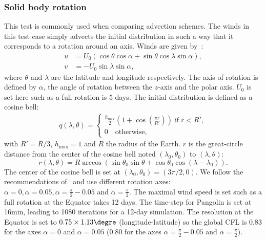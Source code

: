 \subsubsection{Solid body rotation}
This test is commonly used when comparing advection schemes. The winds
in this test case simply advects the initial distribution in such a way that it
corresponds to a rotation around an axis. Winds are given
by~\cite{Williamson1992}:
\begin{align*}
  u &= U_0 (\cos \theta \cos \alpha + \sin \theta \cos \lambda \sin \alpha),\\
  v &= -U_0 \sin \lambda \sin \alpha,
\end{align*}
where $\theta$ and $\lambda$ are the latitude and longitude respectively.
The axis of rotation is defined by $\alpha$, the angle of rotation between the
$z$-axis and the polar axis.  $U_0$ is set here such as a full rotation is 5
days. The initial distribution is defined as a cosine bell:
\begin{align*}
  q(\lambda, \theta) =
  \begin{cases}
    \displaystyle%
   \frac{h_{\text{max}}}{2}%
    \left(1+\cos\left( \frac{\pi r}{R'}\right) \right) \; \text{if} \; r < R',\\
    0 \quad \text{otherwise},
  \end{cases}
\end{align*}
with $R'=R/3$, $h_{\text{max}}=1$ and $R$ the radius of the Earth. $r$ is the great-circle distance
 from the center of the cosine bell noted $(\lambda_0, \theta_0)$ to $(\lambda,\theta)$:
\begin{equation*}
  r(\lambda, \theta)=R \arccos(\sin\theta_0\sin\theta +
  \cos\theta_0\cos(\lambda-\lambda_0)).
\end{equation*}
The center of the cosine bell is set at $(\lambda_0, \theta_0)=(3\pi/2, 0)$.  We
follow the recommendations of~\cite{Williamson1992} and use different rotation
axes: $\alpha=0, \alpha=0.05, \alpha=\frac{\pi}{2}-0.05$ and
$\alpha=\frac{\pi}{2}$. The maximal wind speed is set such as a full rotation at
the Equator takes 12 days. The time-step for Pangolin is set at 16min, leading
to 1080 iterations for a 12-day simulation. The resolution at the Equator is
set to $0.75\times1.13\degre$ (longitude-latitude) so the global CFL is $0.83$
for the axes $\alpha=0$ and $\alpha=0.05$ ($0.80$ for the axes
$\alpha=\frac{\pi}{2}-0.05$ and $\alpha=\frac{\pi}{2}$).

